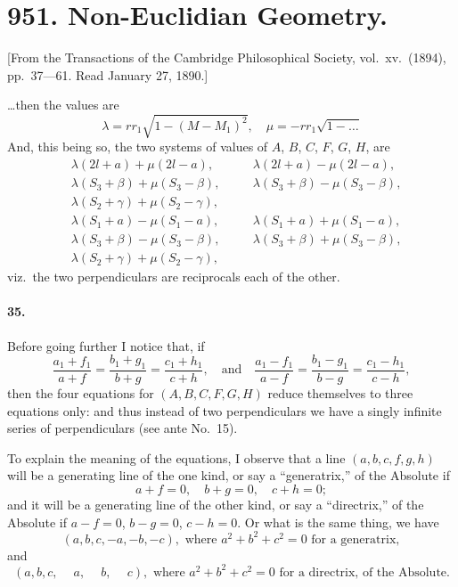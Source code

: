 \documentclass[11pt,a4paper]{book}
\begin{document}
\newpage

\section*{951. Non-Euclidian Geometry.}

[From the Transactions of the Cambridge Philosophical Society, vol.~xv.~(1894), pp.~37---61. Read January 27, 1890.]

\bigskip

\noindent
\ldots then the values are
\[
\lambda = rr_1 \sqrt{1 - (M - M_1)^2}, \quad
\mu = -rr_1 \sqrt{1 - \ldots}
\]
And, this being so, the two systems of values of $A$, $B$, $C$, $F$, $G$, $H$, are
\begin{align*}
&\lambda(2l + a) + \mu(2l - a), \quad &&\lambda(2l + a) - \mu(2l - a), \\
&\lambda (S_3 + \beta) + \mu (S_3 - \beta), \quad &&\lambda (S_3 + \beta) - \mu (S_3 - \beta), \\
&\lambda (S_2 + \gamma) + \mu (S_2 - \gamma), \\
&\lambda(S_1+ a) - \mu(S_1- a), \quad &&\lambda(S_1 + a) + \mu(S_1 - a), \\
&\lambda (S_3 + \beta) - \mu (S_3 - \beta), \quad &&\lambda (S_3 + \beta) + \mu (S_3 - \beta), \\
&\lambda (S_2 + \gamma) + \mu (S_2 - \gamma),
\end{align*}
viz.~the two perpendiculars are reciprocals each of the other.

\paragraph{35.} Before going further I notice that, if
\[
\frac{a_1 + f_1}{a + f} = \frac{b_1 + g_1}{b + g} = \frac{c_1 + h_1}{c + h},
\quad\text{and}\quad
\frac{a_1 - f_1}{a - f} = \frac{b_1 - g_1}{b - g} = \frac{c_1 - h_1}{c - h},
\]
then the four equations for $(A, B, C, F, G, H)$ reduce themselves to three equations
only: and thus instead of two perpendiculars we have a singly infinite series of
perpendiculars (see ante No.~15).

To explain the meaning of the equations, I observe that a line $(a, b, c, f, g, h)$
will be a generating line of the one kind, or say a ``generatrix,'' of the Absolute if
\[
a+f=0, \quad b+g = 0, \quad c + h = 0;
\]
and it will be a generating line of the other kind, or say a ``directrix,'' of the
Absolute if $a-f=0$, $b-g = 0$, $c - h = 0$. Or what is the same thing, we have
\[
(a, b, c, -a, -b, -c), \text{ where } a^2 + b^2 + c^2 = 0 \text{ for a generatrix},
\]
and
\[
(a, b, c, \phantom{-}a, \phantom{-}b, \phantom{-}c), \text{ where } a^2 + b^2 + c^2 = 0 \text{ for a directrix, of the Absolute}.
\]
\end{document}
